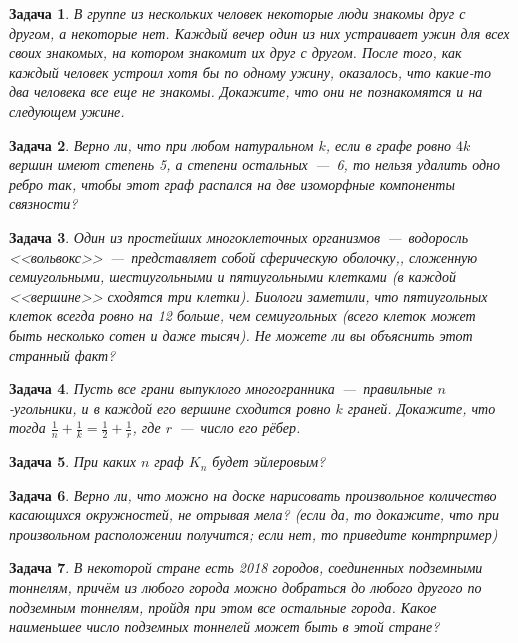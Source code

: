 \documentclass[12pt,a4paper,fleqn]{article}
\newtheorem{exersize}{Задача}
\begin{document}
\begin{exersize}
	В группе из нескольких человек некоторые люди знакомы друг с другом, а некоторые нет. Каждый вечер один из них устраивает ужин для всех своих знакомых, на котором знакомит их друг с другом. После того, как каждый человек устроил хотя бы по одному ужину, оказалось, что какие-то два человека все еще не знакомы. Докажите, что они не познакомятся и на следующем ужине.
\end{exersize}

\begin{exersize}
	Верно ли, что при любом натуральном $k$, если в графе ровно $4k$ вершин имеют степень 5, а степени остальных~---~6, то нельзя удалить одно ребро так, чтобы этот граф распался на две изоморфные компоненты связности?
\end{exersize}


\begin{exersize}
	Один из простейших многоклеточных организмов~---~водоросль <<вольвокс>>~---~представляет собой сферическую оболочку,, сложенную семиугольными, шестиугольными и пятиугольными клетками (в каждой <<вершине>> сходятся три клетки). Биологи заметили, что пятиугольных клеток всегда ровно на 12 больше, чем семиугольных (всего клеток может быть несколько сотен и даже тысяч). Не можете ли вы объяснить этот странный факт?
\end{exersize}

\begin{exersize}
	Пусть все грани выпуклого многогранника~---~правильные $n$-угольники, и в каждой его вершине сходится ровно $k$ граней. Докажите, что тогда $\frac{1}{n} + \frac{1}{k} = \frac{1}{2} + \frac{1}{r}$, где $r$~---~число его рёбер.
\end{exersize}

\begin{exersize}
	При каких $n$ граф $K_n$ будет эйлеровым?
\end{exersize}

\begin{exersize}
	Верно ли, что можно на доске нарисовать произвольное количество касающихся окружностей, не отрывая мела? (если да, то докажите, что при произвольном расположении получится; если нет, то приведите контрпример)
\end{exersize}

\begin{exersize}
	В некоторой стране есть 2018 городов, соединенных подземными тоннелям, причём из любого города можно добраться до любого другого по подземным тоннелям, пройдя при этом все остальные города. Какое наименьшее число подземных тоннелей может быть в этой стране?
\end{exersize}
\end{document}
